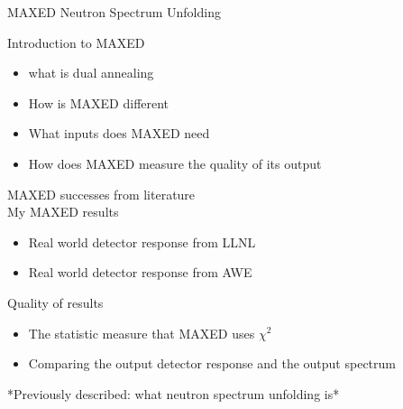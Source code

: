 \documentclass[11pt]{article}
\begin{document}
\begin{center}
MAXED Neutron Spectrum Unfolding
\end{center}

Introduction to MAXED
\begin{itemize}
   \item what is dual annealing
   \item How is MAXED different
   \item What inputs does MAXED need
   \item How does MAXED measure the quality of its output
\end{itemize}

MAXED successes from literature\\

My MAXED results
\begin{itemize}
\item Real world detector response from LLNL
\item Real world detector response from AWE
\end{itemize}

Quality of results
\begin{itemize}
\item The statistic measure that MAXED uses $\chi^2$
\item Comparing the output detector response and the output spectrum
\end{itemize}
\break

*Previously described: what neutron spectrum unfolding is*\\

\hfill

\end{document}
